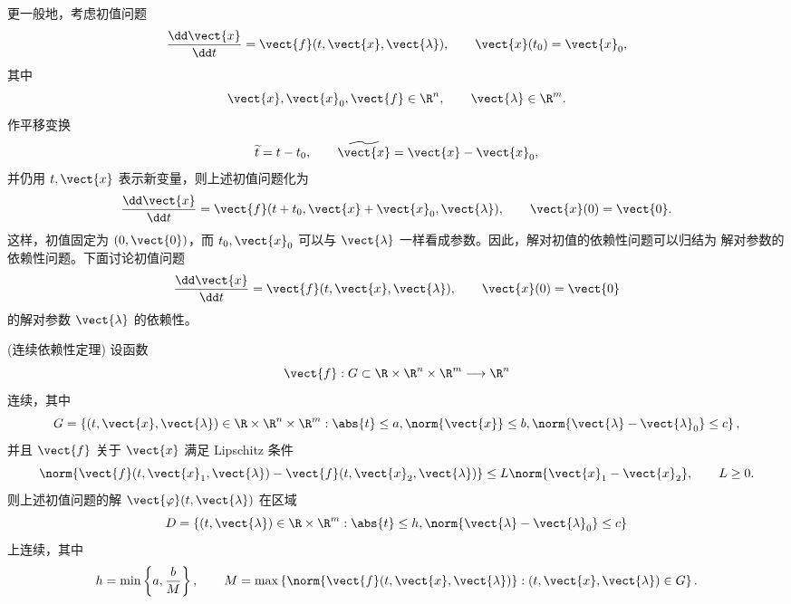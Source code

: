 更一般地，考虑初值问题
\[
	\dfrac{\dd\vect{x}}{\dd t}
	=\vect{f}(t,\vect{x},\vect{\lambda}),
	\qquad
	\vect{x}(t_0)=\vect{x}_0,
\]
其中
\[
	\vect{x},\vect{x}_0,\vect{f}\in\R^n,
	\qquad
	\vect{\lambda}\in\R^m.
\]
作平移变换
\[
	\widetilde{t}=t-t_0,
	\qquad
	\widetilde{\vect{x}}=\vect{x}-\vect{x}_0,
\]
并仍用 $t,\vect{x}$ 表示新变量，则上述初值问题化为
\[
	\dfrac{\dd\vect{x}}{\dd t}
	=\vect{f}(t+t_0,\vect{x}+\vect{x}_0,\vect{\lambda}),
	\qquad
	\vect{x}(0)=\vect{0}.
\]
这样，初值固定为 $(0,\vect{0})$，而 $t_0,\vect{x}_0$ 可以与
$\vect{\lambda}$ 一样看成参数。因此，解对初值的依赖性问题可以归结为
解对参数的依赖性问题。下面讨论初值问题
\[
	\dfrac{\dd\vect{x}}{\dd t}
	=\vect{f}(t,\vect{x},\vect{\lambda}),
	\qquad
	\vect{x}(0)=\vect{0}
\]
的解对参数 $\vect{\lambda}$ 的依赖性。

\begin{theorem}(连续依赖性定理)\label{thm:连续依赖性定理}
	设函数
	\[
		\vect{f}:G\subset\R\times\R^n\times\R^m\longrightarrow\R^n
	\]
	连续，其中
	\[
		G=\left\{
		(t,\vect{x},\vect{\lambda})\in\R\times\R^n\times\R^m:
		\abs{t}\leq a,
		\norm{\vect{x}}\leq b,
		\norm{\vect{\lambda}-\vect{\lambda}_0}\leq c
		\right\},
	\]
	并且 $\vect{f}$ 关于 $\vect{x}$ 满足 Lipschitz 条件
	\[
		\norm{
		\vect{f}(t,\vect{x}_1,\vect{\lambda})
		-\vect{f}(t,\vect{x}_2,\vect{\lambda})
		}
		\leq L\norm{\vect{x}_1-\vect{x}_2},
		\qquad L\geq0.
	\]
	则上述初值问题的解 $\vect{\varphi}(t,\vect{\lambda})$ 在区域
	\[
		D=\left\{
		(t,\vect{\lambda})\in\R\times\R^m:
		\abs{t}\leq h,
		\norm{\vect{\lambda}-\vect{\lambda}_0}\leq c
		\right\}
	\]
	上连续，其中
	\[
		h=\min\left\{a,\dfrac{b}{M}\right\},
		\qquad
		M=\max\left\{
		\norm{\vect{f}(t,\vect{x},\vect{\lambda})}:
		(t,\vect{x},\vect{\lambda})\in G
		\right\}.
	\]
\end{theorem}

